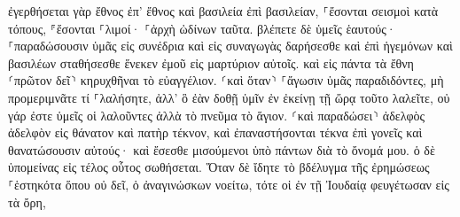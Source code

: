 \documentclass{openreader}
\begin{document}
ἐγερθήσεται γὰρ ἔθνος ἐπ’ ἔθνος καὶ βασιλεία ἐπὶ βασιλείαν, ⸀ἔσονται σεισμοὶ κατὰ τόπους, ⸁ἔσονται ⸀λιμοί· ⸀ἀρχὴ ὠδίνων ταῦτα. 
βλέπετε δὲ ὑμεῖς ἑαυτούς· ⸀παραδώσουσιν ὑμᾶς εἰς συνέδρια καὶ εἰς συναγωγὰς δαρήσεσθε καὶ ἐπὶ ἡγεμόνων καὶ βασιλέων σταθήσεσθε ἕνεκεν ἐμοῦ εἰς μαρτύριον αὐτοῖς. 
καὶ εἰς πάντα τὰ ἔθνη ⸂πρῶτον δεῖ⸃ κηρυχθῆναι τὸ εὐαγγέλιον. 
⸂καὶ ὅταν⸃ ⸀ἄγωσιν ὑμᾶς παραδιδόντες, μὴ προμεριμνᾶτε τί ⸀λαλήσητε, ἀλλ’ ὃ ἐὰν δοθῇ ὑμῖν ἐν ἐκείνῃ τῇ ὥρᾳ τοῦτο λαλεῖτε, οὐ γάρ ἐστε ὑμεῖς οἱ λαλοῦντες ἀλλὰ τὸ πνεῦμα τὸ ἅγιον. 
⸂καὶ παραδώσει⸃ ἀδελφὸς ἀδελφὸν εἰς θάνατον καὶ πατὴρ τέκνον, καὶ ἐπαναστήσονται τέκνα ἐπὶ γονεῖς καὶ θανατώσουσιν αὐτούς· 
καὶ ἔσεσθε μισούμενοι ὑπὸ πάντων διὰ τὸ ὄνομά μου. ὁ δὲ ὑπομείνας εἰς τέλος οὗτος σωθήσεται. 
Ὅταν δὲ ἴδητε τὸ βδέλυγμα τῆς ἐρημώσεως ⸀ἑστηκότα ὅπου οὐ δεῖ, ὁ ἀναγινώσκων νοείτω, τότε οἱ ἐν τῇ Ἰουδαίᾳ φευγέτωσαν εἰς τὰ ὄρη, 
\end{document}

